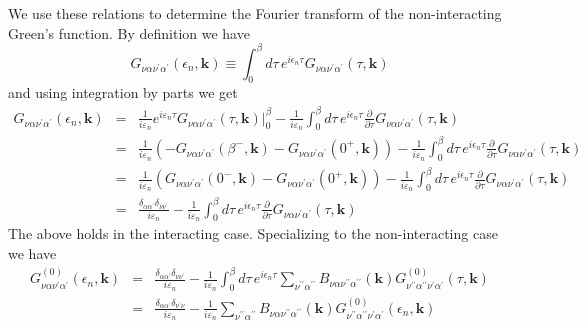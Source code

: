 We use these relations to determine the Fourier transform
of the non-interacting Green's function.  By definition we
have
\begin{equation}
G_{\nu\alpha\nu^{\prime}\alpha^{\prime}}(\epsilon_n,\mathbf{k}) \equiv
\int^{\beta}_0 d\tau\,e^{i\epsilon_n \tau} 
G_{\nu\alpha\nu^{\prime}\alpha^{\prime}}(\tau,\mathbf{k})
\end{equation}
and using integration by parts we get
\begin{eqnarray}
G_{\nu\alpha\nu^{\prime}\alpha^{\prime}}(\epsilon_n,\mathbf{k}) & = &
\frac{1}{i\varepsilon_n} e^{i\varepsilon_n\tau} 
G_{\nu\alpha\nu^{\prime}\alpha^{\prime}}(\tau,\mathbf{k}) |^{\beta}_0
- \frac{1}{i\varepsilon_n} 
\int^{\beta}_0 d\tau\,e^{i\epsilon_n \tau}
\frac{\partial}{\partial\tau} G_{\nu\alpha\nu^{\prime}\alpha^{\prime}}(\tau,\mathbf{k}) \\
& = &
\frac{1}{i\varepsilon_n}
\left(-G_{\nu\alpha\nu^{\prime}\alpha^{\prime}}(\beta^-,\mathbf{k}) -
       G_{\nu\alpha\nu^{\prime}\alpha^{\prime}}(0^+,\mathbf{k}) \right)
- \frac{1}{i\varepsilon_n} 
\int^{\beta}_0 d\tau\,e^{i\epsilon_n \tau}
\frac{\partial}{\partial\tau} 
G_{\nu\alpha\nu^{\prime}\alpha^{\prime}}(\tau,\mathbf{k}) \\
& = &
\frac{1}{i\varepsilon_n}
\left(G_{\nu\alpha\nu^{\prime}\alpha^{\prime}}(0^-,\mathbf{k}) -
       G_{\nu\alpha\nu^{\prime}\alpha^{\prime}}(0^+,\mathbf{k}) \right)
- \frac{1}{i\varepsilon_n} 
\int^{\beta}_0 d\tau\,e^{i\epsilon_n \tau}
\frac{\partial}{\partial\tau} G_{\nu\alpha\nu^{\prime}\alpha^{\prime}}(\tau,\mathbf{k}) \\
& = &
\frac{\delta_{\alpha\alpha^{\prime}}\delta_{\nu\nu^{\prime}}}{i\varepsilon_n}
- \frac{1}{i\varepsilon_n} 
\int^{\beta}_0 d\tau\,e^{i\epsilon_n \tau}
\frac{\partial}{\partial\tau} G_{\nu\alpha\nu^{\prime}\alpha^{\prime}}(\tau,\mathbf{k})
\end{eqnarray}
The above holds in the interacting case.  Specializing to
the non-interacting case we have
\begin{eqnarray}
G^{(0)}_{\nu\alpha\nu^{\prime}\alpha^{\prime}}(\epsilon_n,\mathbf{k}) & = &
\frac{\delta_{\alpha\alpha^{\prime}}\delta_{\nu\nu^{\prime}}}{i\varepsilon_n}
- \frac{1}{i\varepsilon_n} 
\int^{\beta}_0 d\tau\,e^{i\epsilon_n \tau}
\sum_{\nu^{\prime\prime}\alpha^{\prime\prime}} 
B_{\nu\alpha\nu^{\prime\prime}\alpha^{\prime\prime}}(\mathbf{k}) 
G^{(0)}_{\nu^{\prime\prime}\alpha^{\prime\prime}\nu^{\prime}\alpha^{\prime}}(\tau,\mathbf{k})\\
& = &
\frac{\delta_{\alpha\alpha^{\prime}}\delta_{\nu^{\prime}\nu}}{i\varepsilon_n}
- \frac{1}{i\varepsilon_n} \sum_{\nu^{\prime\prime}\alpha^{\prime\prime}}  
B_{\nu\alpha\nu^{\prime\prime}\alpha^{\prime\prime}}(\mathbf{k})
G^{(0)}_{\nu^{\prime\prime}\alpha^{\prime\prime}\nu^{\prime}\alpha^{\prime}}(\epsilon_n,\mathbf{k})
\end{eqnarray}
